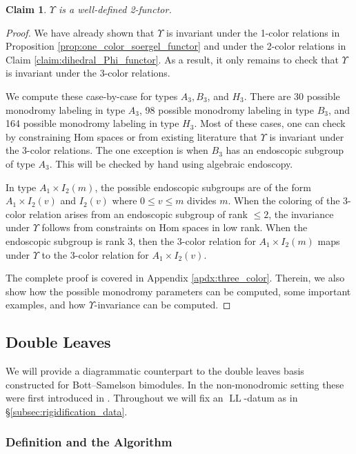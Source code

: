 \documentclass{amsart}
\DeclareMathOperator{\LL}{LL}
\newtheorem{claim}[subsubsection]{Claim}
\theoremstyle{definition}
\numberwithin{equation}{subsection}
\begin{document}
\begin{claim}\label{claim:Phi_well_defined}
    $\Upsilon$ is a well-defined 2-functor.
\end{claim}
\begin{proof}
    We have already shown that $\Upsilon$ is invariant under the 1-color relations in Proposition \ref{prop:one_color_soergel_functor} and under the 2-color relations in Claim \ref{claim:dihedral_Phi_functor}.
    As a result, it only remains to check that $\Upsilon$ is invariant under the 3-color relations.
    
    We compute these case-by-case for types $A_3, B_3$, and $H_3$. There are 30 possible monodromy labeling in type $A_3$, 98 possible monodromy labeling in type $B_3$, and 164 possible monodromy labeling in type $H_3$. 
    Most of these cases, one can check by constraining Hom spaces or from existing literature that  $\Upsilon$ is invariant under the 3-color relations.
    The one exception is when $B_3$ has an endoscopic subgroup of type $A_3$. This will be checked by hand using algebraic endoscopy.
    
    In type $A_1 \times I_2 (m)$, the possible endoscopic subgroups are of the form $A_1 \times I_2 (v)$ and $I_2 (v)$ where $0 \leq v \leq m$ divides $m$.
    When the coloring of the 3-color relation arises from an endoscopic subgroup of rank $\leq 2$, the invariance under $\Upsilon$ follows from constraints on Hom spaces in low rank.
    When the endoscopic subgroup is rank 3, then the 3-color relation for $A_1 \times I_2 (m)$ maps under $\Upsilon$ to the 3-color relation for $A_1 \times I_2 (v)$.

    The complete proof is covered in Appendix \ref{apdx:three_color}. 
    Therein, we also show how the possible monodromy parameters can be computed, some important examples, and how $\Upsilon$-invariance can be computed. 
\end{proof}

\subsection{Double Leaves}

We will provide a diagrammatic counterpart to the double leaves basis constructed for Bott--Samelson bimodules. In the non-monodromic setting these were first introduced in \cite{EW}.
Throughout we will fix an $\LL$-datum as in \S \ref{subsec:rigidification_data}.

\subsubsection{Definition and the Algorithm}\label{subsubsec:diag_ll_section}
\end{document}
